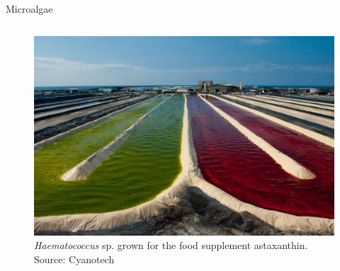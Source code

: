 \documentclass[8pt]{beamer}\usepackage[]{graphicx}\usepackage[]{color}
\begin{document}
\begin{frame}{Microalgae}
\begin{columns}[t]
                        \begin{figure}
                                \includegraphics[width=1\textwidth]{./figure/Haematococcus_astaxanthin_Cyanotech.png}
                                \caption{\small{\it Haematococcus} sp. grown for the food supplement astaxanthin. Source: Cyanotech} %
                        \end{figure}
        \end{columns}

\end{frame}
\end{document}
